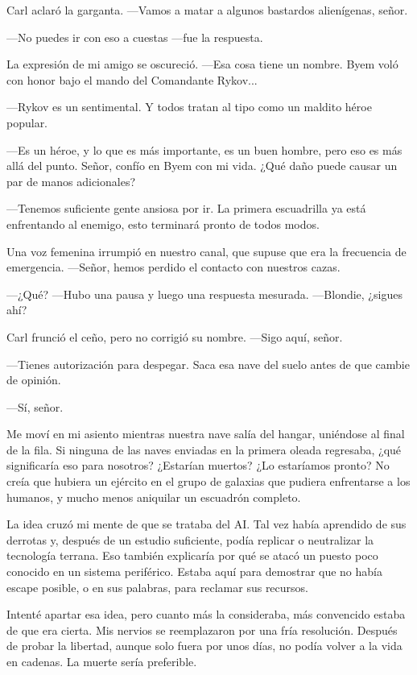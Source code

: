\documentclass[spanish,12pt,a4paper,oneside,titlepage]{book}
\begin{document}
    Carl aclaró la garganta. —Vamos a matar a algunos bastardos alienígenas, señor.

    —No puedes ir con eso a cuestas —fue la respuesta.

    La expresión de mi amigo se oscureció. —Esa cosa tiene un nombre. Byem voló con honor bajo el mando del Comandante Rykov...

    —Rykov es un sentimental. Y todos tratan al tipo como un maldito héroe popular.

    —Es un héroe, y lo que es más importante, es un buen hombre, pero eso es más allá del punto. Señor, confío en Byem con mi vida. ¿Qué daño puede causar un par de manos adicionales?

    —Tenemos suficiente gente ansiosa por ir. La primera escuadrilla ya está enfrentando al enemigo, esto terminará pronto de todos modos.

    Una voz femenina irrumpió en nuestro canal, que supuse que era la frecuencia de emergencia. —Señor, hemos perdido el contacto con nuestros cazas.

    —¿Qué? —Hubo una pausa y luego una respuesta mesurada. —Blondie, ¿sigues ahí?

    Carl frunció el ceño, pero no corrigió su nombre. —Sigo aquí, señor.

    —Tienes autorización para despegar. Saca esa nave del suelo antes de que cambie de opinión.

    —Sí, señor.

    Me moví en mi asiento mientras nuestra nave salía del hangar, uniéndose al final de la fila. Si ninguna de las naves enviadas en la primera oleada regresaba, ¿qué significaría eso para nosotros? ¿Estarían muertos? ¿Lo estaríamos pronto? No creía que hubiera un ejército en el grupo de galaxias que pudiera enfrentarse a los humanos, y mucho menos aniquilar un escuadrón completo.

    La idea cruzó mi mente de que se trataba del AI. Tal vez había aprendido de sus derrotas y, después de un estudio suficiente, podía replicar o neutralizar la tecnología terrana. Eso también explicaría por qué se atacó un puesto poco conocido en un sistema periférico. Estaba aquí para demostrar que no había escape posible, o en sus palabras, para reclamar sus recursos.

    Intenté apartar esa idea, pero cuanto más la consideraba, más convencido estaba de que era cierta. Mis nervios se reemplazaron por una fría resolución. Después de probar la libertad, aunque solo fuera por unos días, no podía volver a la vida en cadenas. La muerte sería preferible.
\end{document}
